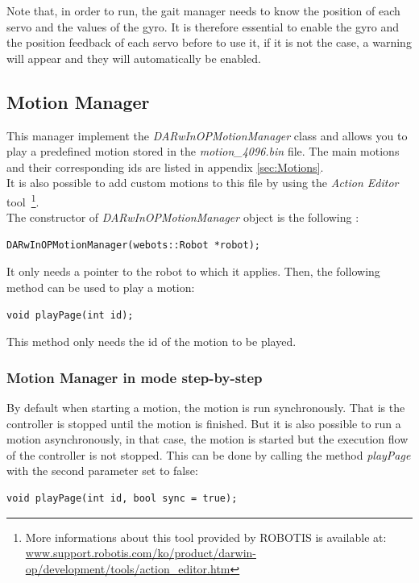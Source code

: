 \documentclass[a4paper, 12pt]{article}  		%
\begin{document}
Note that, in order to run, the gait manager needs to know the position of each servo and the values of the gyro. It is therefore essential to enable the gyro and the position feedback of each servo before to use it, if it is not the case, a warning will appear and they will automatically be enabled.\\

\subsection{Motion Manager}
This manager implement the \textit{DARwInOPMotionManager} class and allows you to play a predefined motion stored in the \textit{motion\_4096.bin} file. The main motions and their corresponding ids are listed in appendix \ref{sec:Motions}.\\

It is also possible to add custom motions to this file by using the \textit{Action Editor} tool \,\footnote{ More informations about this tool provided by ROBOTIS is available at: \url{www.support.robotis.com/ko/product/darwin-op/development/tools/action_editor.htm}}.\\

The constructor of \textit{DARwInOPMotionManager} object is the following :\\
\lstset{language=c++} 
\lstset{commentstyle=\textit} 
\begin{lstlisting} 
DARwInOPMotionManager(webots::Robot *robot);
\end{lstlisting}

It only needs a pointer to the robot to which it applies. Then, the following method can be used to play a motion:\\

\lstset{language=c++} 
\lstset{commentstyle=\textit} 
\begin{lstlisting} 
void playPage(int id);
\end{lstlisting}

This method only needs the id of the motion to be played.\\

\subsubsection{Motion Manager in mode step-by-step}

By default when starting a motion, the motion is run synchronously. That is the controller is stopped until the motion is finished. But it is also possible to run a motion asynchronously, in that case, the motion is started but the execution flow of the controller is not stopped. This can be done by calling the method \textit{playPage} with the second parameter set to false:\\
\lstset{language=c++} 
\lstset{commentstyle=\textit} 
\begin{lstlisting} 
void playPage(int id, bool sync = true);
\end{lstlisting}
\end{document}
